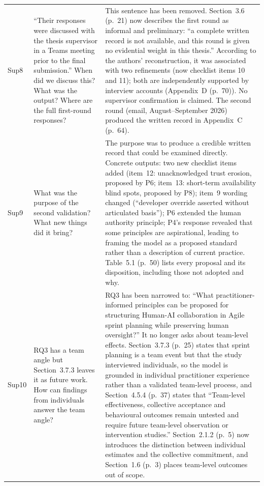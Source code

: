 \documentclass[12pt,a4paper,twoside]{article}
\begin{document}
{\begin{longtable}{p{1cm}p{6.7cm}p{7cm}}
Sup8 &
``Their responses were discussed with the thesis supervisor in a Teams meeting prior
to the final submission.'' When did we discuss this? What was the output? Where are
the full first-round responses? &
This sentence has been removed. Section~3.6 (p.~21) now describes the first round as informal and preliminary: ``a complete written record is not available, and this round is given no evidential weight in this thesis.'' According to the authors' reconstruction, it was associated with two refinements (now checklist items 10 and 11); both are independently supported by interview accounts (Appendix~D (p.~70)). No supervisor confirmation is claimed. The second round (email, August--September 2026) produced the written record in Appendix~C (p.~64). \\

Sup9 &
What was the purpose of the second validation? What new things did it bring? &
The purpose was to produce a credible written record that could be examined directly. Concrete outputs: two new checklist items added (item~12: unacknowledged trust erosion, proposed by P6; item~13: short-term availability blind spots, proposed by P8); item~9 wording changed (``developer override asserted without articulated basis''); P6 extended the human authority principle; P4's response revealed that some principles are aspirational, leading to framing the model as a proposed standard rather than a description of current practice. Table~5.1 (p.~50) lists every proposal and its disposition, including those not adopted and why. \\

Sup10 &
RQ3 has a team angle but Section~3.7.3 leaves it as future work. How can findings
from individuals answer the team angle? &
RQ3 has been narrowed to: ``What practitioner-informed principles can be proposed for structuring Human-AI collaboration in Agile sprint planning while preserving human oversight?'' It no longer asks about team-level effects. Section~3.7.3 (p.~25) states that sprint planning is a team event but that the study interviewed individuals, so the model is grounded in individual practitioner experience rather than a validated team-level process, and Section~4.5.4 (p.~37) states that ``Team-level effectiveness, collective acceptance and behavioural outcomes remain untested and require future team-level observation or intervention studies.'' Section~2.1.2 (p.~5) now introduces the distinction between individual estimates and the collective commitment, and Section~1.6 (p.~3) places team-level outcomes out of scope. \\


\end{longtable}}
\end{document}
